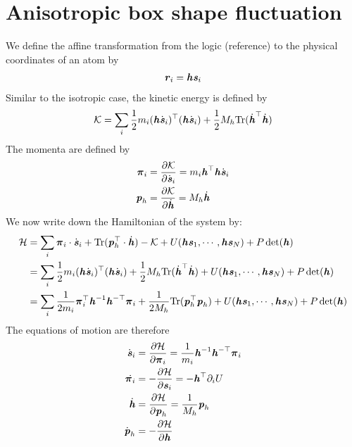 \documentclass[aps, pre, preprint,unsortedaddress,a4paper,onecolumn]{revtex4}
\newcommand{\vect}[1]{\textbf{\textit{#1}}}
\newcommand{\mypi}{\boldsymbol\pi}
\newcommand{\trace}{\textrm{Tr}}
\newcommand{\dvs}{\dot{\vect s}}
\newcommand{\dvh}{\dot{\vect h}}
\begin{document}
\section{Anisotropic box shape fluctuation}

We define the affine transformation from the logic (reference) to the physical coordinates
of an atom by
\begin{align}
  \vect r_i = \vect h \vect s_i
\end{align}
Similar to the isotropic case, the kinetic energy is defined by
\begin{align}
  \mathcal K = \sum_i \frac12 m_i (\vect h \dvs_i)^\top(\vect h \dvs_i) + \frac12 M_h \trace (\dvh^\top \dvh)
\end{align}
The momenta are defined by
\begin{align}
  \mypi_i & = \frac{\partial\mathcal K}{\partial\dvs_i} = m_i \vect h^\top\vect h \dvs_i\\
  \vect p_h &= \frac{\partial \mathcal K}{\partial \dvh}  = M_h \dvh
\end{align}
We now write down the Hamiltonian of the system by:
\begin{align}\nonumber
  \mathcal H & = \sum_i \mypi_i\cdot\dvs_i + \trace (\vect p_h^\top \cdot \dvh ) - \mathcal K + U(\vect h\vect s_1, \cdots, \vect h\vect s_N) + P\det (\vect h)\\\nonumber
             & = \sum_i \frac12 m_i (\vect h \dvs_i)^\top(\vect h \dvs_i) + \frac12 M_h \trace (\dvh^\top \dvh) + U(\vect h\vect s_1, \cdots, \vect h\vect s_N) + P\det (\vect h)\\ \label{eqn:a-hamiltonian}
             & = \sum_i \frac1{2m_i} \mypi_i^\top \vect h^{-1}\vect h^{-\top}\mypi_i + \frac1{2M_h}\trace (\vect p_h^\top \vect p_h)  + U(\vect h\vect s_1, \cdots, \vect h\vect s_N) + P\det (\vect h)
\end{align}
The equations of motion are therefore
\begin{align}
  \dvs_i &= \frac{\partial\mathcal H}{\partial \mypi_i} = \frac1{m_i}\vect h^{-1}\vect h^{-\top}\mypi_i \\
  \dot{\mypi_i} & = -\frac{\partial \mathcal H}{\partial \vect s_i} =  - \vect h^\top \partial_i U\\
  \dvh &= \frac{\partial\mathcal H}{\partial \vect p_h} = \frac1{M_h}{\vect p_h}\\ \label{eqn:a-dph}
  \dot{\vect p}_h & = - \frac{\partial\mathcal H}{\partial \vect h}
\end{align}
\end{document}
